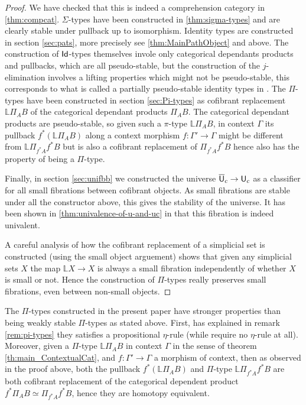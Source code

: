 \documentclass[reqno,10pt,a4paper,oneside,draft]{amsart}
\begin{document}
\begin{proof}

We have checked that this is indeed a comprehension category in \ref{thm:compcat}. $\Sigma$-types have been constructed in \ref{thm:sigma-types} and are clearly stable under pullback up to isomorphism. Identity types are constructed in section \ref{sec:pats}, more precisely see \cref{thm:MainPathObject} and above. The construction of $\mathsf{Id}$-types themselves invole only categorical dependants products and pullbacks, which are all pseudo-stable, but the construction of the $j$-elimination involves a lifting properties which might not be pseudo-stable, this corresponds to what is called a partially pseudo-stable identity types in \cite[definition 2.3.4]{LumsdaineP:locuoc}.
The $\Pi$-types have been constructed in section \ref{sec:Pi-types} as cofibrant replacement $\mathbb{L} \Pi_A B$ of the categorical dependant products $\Pi_A B$. The categorical dependant products are pseudo-stable, so given such a $\pi$-type $\mathbb{L} \Pi_A B$, in context $\Gamma$ its pullback $f^*( \mathbb{L} \Pi_A B)$ along a context morphism $f:\Gamma' \rightarrow \Gamma$ might be different from $\mathbb{L} \Pi_{f^* A} f^* B$ but is also a cofibrant replacement of $\Pi_{f^* A} f^* B$ hence also has the property of being a $\Pi$-type.

Finally, in section \ref{sec:unifbb} we constructed the universe $\overline{\mathsf{U}}_c \rightarrow \mathsf{U}_c$ as a classifier for all small fibrations between cofibrant objects. As small fibrations are stable under all the constructor above, this gives the stability of the universe. It has been shown in \ref{thm:univalence-of-u-and-uc} in that this fibration is indeed univalent.

A careful analysis of how the cofibrant replacement of a simplicial set is constructed (using the small object arguement) shows that given any simplicial sets $X$ the map $\mathbb{L} X \rightarrow X$ is always a small fibration independently of whether $X$ is small or not. Hence the construction of $\Pi$-types really preserves small fibrations, even between non-small objects.
\end{proof}




\begin{remark}
The $\Pi$-types constructed in the present paper have stronger properties than being weakly stable $\Pi$-types as stated above. First, has explained in remark \ref{rem:pi-types} they satisfies a propositional $\eta$-rule (while \cite{LumsdaineP:locuoc} require no $\eta$-rule at all). Moreover, given a $\Pi$-type $\mathbb{L} \Pi_A B$ in context $\Gamma$ in the sense of theorem \ref{th:main_ContextualCat}, and $f: \Gamma' \rightarrow \Gamma$ a morphism of context, then as observed in the proof above, both the pullback $f^*( \mathbb{L} \Pi_A B )$ and $\Pi$-type $\mathbb{L} \Pi_{f^* A} f^* B$ are both cofibrant replacement of the categorical dependent product $f^* \Pi_A B \simeq \Pi_{f^*A} f^* B $, hence they are homotopy equivalent. 


\end{remark}
\end{document}
